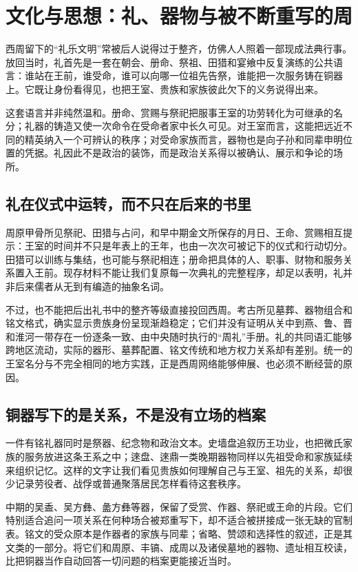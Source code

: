 \section{文化与思想：礼、器物与被不断重写的周}

西周留下的“礼乐文明”常被后人说得过于整齐，仿佛人人照着一部现成法典行事。放回当时，礼首先是一套在朝会、册命、祭祖、田猎和宴飨中反复演练的公共语言：谁站在王前，谁受命，谁可以向哪一位祖先告祭，谁能把一次服务铸在铜器上。它既让身份看得见，也把王室、贵族和家族彼此欠下的义务说得出来。

这套语言并非纯然温和。册命、赏赐与祭祀把服事王室的功劳转化为可继承的名分；礼器的铸造又使一次命令在受命者家中长久可见。对王室而言，这能把远近不同的精英纳入一个可辨认的秩序；对受命家族而言，器物也是向子孙和同辈申明位置的凭据。礼因此不是政治的装饰，而是政治关系得以被确认、展示和争论的场所。

\subsection{礼在仪式中运转，而不只在后来的书里}

周原甲骨所见祭祀、田猎与占问，和早中期金文所保存的月日、王命、赏赐相互提示：王室的时间并不只是年表上的王年，也由一次次可被记下的仪式和行动切分。田猎可以训练与集结，也可能与祭祀相连；册命把具体的人、职事、财物和服务关系置入王前。现存材料不能让我们复原每一次典礼的完整程序，却足以表明，礼并非后来儒者从无到有编造的抽象名词。

不过，也不能把后出礼书中的整齐等级直接投回西周。考古所见墓葬、器物组合和铭文格式，确实显示贵族身份呈现渐趋稳定；它们并没有证明从关中到燕、鲁、晋和淮河一带存在一份逐条一致、由中央随时执行的“周礼”手册。礼的共同语汇能够跨地区流动，实际的器形、墓葬配置、铭文传统和地方权力关系却有差别。统一的王室名分与不完全相同的地方实践，正是西周网络能够伸展、也必须不断经营的原因。

\subsection{铜器写下的是关系，不是没有立场的档案}

一件有铭礼器同时是祭器、纪念物和政治文本。史墙盘追叙历王功业，也把微氏家族的服务放进这条王系之中；逨盘、逨鼎一类晚期器物同样以先祖受命和家族延续来组织记忆。这样的文字让我们看见贵族如何理解自己与王室、祖先的关系，却很少记录劳役者、战俘或普通聚落居民怎样看待这套秩序。

中期的吴盉、吴方彝、盠方彝等器，保留了受赏、作器、祭祀或王命的片段。它们特别适合追问一项关系在何种场合被郑重写下，却不适合被拼接成一张无缺的官制表。铭文的受众原本是作器者的家族与同辈；省略、赞颂和选择性的叙述，正是其文类的一部分。将它们和周原、丰镐、成周以及诸侯墓地的器物、遗址相互校读，比把铜器当作自动回答一切问题的档案更能接近当时。

